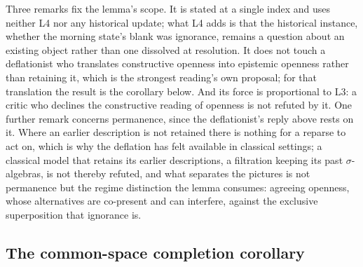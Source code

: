 \noindent Three remarks fix the lemma's scope. It is stated at a single index and uses neither L4 nor any historical update; what L4 adds is that the historical instance, whether the morning state's blank was ignorance, remains a question about an existing object rather than one dissolved at resolution. It does not touch a deflationist who translates constructive openness into epistemic openness rather than retaining it, which is the strongest reading's own proposal; for that translation the result is the corollary below. And its force is proportional to L3: a critic who declines the constructive reading of openness is not refuted by it. One further remark concerns permanence, since the deflationist's reply above rests on it. Where an earlier description is not retained there is nothing for a reparse to act on, which is why the deflation has felt available in classical settings; a classical model that retains its earlier descriptions, a filtration keeping its past $\sigma$-algebras, is not thereby refuted, and what separates the pictures is not permanence but the regime distinction the lemma consumes: agreeing openness, whose alternatives are co-present and can interfere, against the exclusive superposition that ignorance is.

\subsection{The common-space completion corollary}\label{sec:samplespace}

